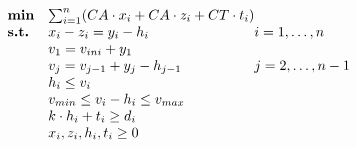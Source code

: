 \documentclass{article}
\begin{document}
\begin{equation*}
    \begin{array}{ll@{}ll}
        \textbf{min}  & \sum_{i=1}^{n} (CA \cdot x_i + CA \cdot z_i + CT \cdot t_{i}) &\\
        \textbf{s.t.} & x_i - z_i = y_i - h_i &i=1 ,\dots, n\\
                      & v_1 = v_{ini} + y_1 &\\ 
                      & v_j = v_{j-1} + y_j - h_{j-1} &j=2 ,\dots, n-1&\\
                      & h_i \le v_i &\\
                      & v_{min} \le v_i - h_i \le v_{max} &\\
                      & k \cdot h_i + t_i \ge d_i &\\
                      & x_i,z_i,h_i,t_i \ge 0
    \end{array}
\end{equation*}
\end{document}
